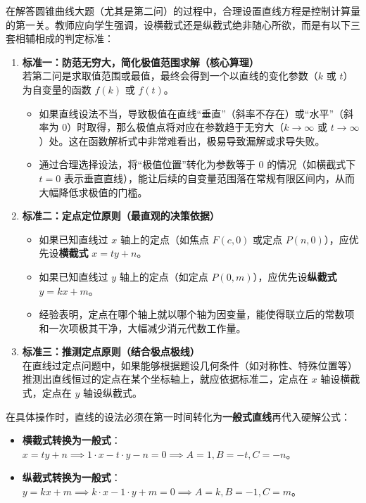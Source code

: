 \documentclass[11pt,a4paper]{ctexart}
\begin{document}
在解答圆锥曲线大题（尤其是第二问）的过程中，合理设置直线方程是控制计算量的第一关。教师应向学生强调，设横截式还是纵截式绝非随心所欲，而是有以下三套相辅相成的判定标准：

\begin{enumerate}[label=\arabic*.]
  \item \textbf{标准一：防范无穷大，简化极值范围求解（核心算理）} \\
        若第二问是求取值范围或最值，最终会得到一个以直线的变化参数（$k$ 或 $t$）为自变量的函数 $f(k)$ 或 $f(t)$。
        \begin{itemize}
          \item 如果直线设法不当，导致极值在直线“垂直”（斜率不存在）或“水平”（斜率为 $0$）时取得，那么极值点将对应在参数趋于无穷大（$k \to \infty$ 或 $t \to \infty$）处。这在函数解析式中非常难看出，极易导致漏解或求导失败。
          \item 通过合理选择设法，将“极值位置”转化为参数等于 $0$ 的情况（如横截式下 $t=0$ 表示垂直直线），能让后续的自变量范围落在常规有限区间内，从而大幅降低求极值的门槛。
        \end{itemize}
        
  \item \textbf{标准二：定点定位原则（最直观的决策依据）} \\
        \begin{itemize}
          \item 如果已知直线过 $x$ 轴上的定点（如焦点 $F(c,0)$ 或定点 $P(n,0)$），应优先设\textbf{横截式} $x = ty + n$。
          \item 如果已知直线过 $y$ 轴上的定点（如定点 $P(0,m)$），应优先设\textbf{纵截式} $y = kx + m$。
          \item 经验表明，定点在哪个轴上就以哪个轴为因变量，能使得联立后的常数项和一次项极其干净，大幅减少消元代数工作量。
        \end{itemize}

  \item \textbf{标准三：推测定点原则（结合极点极线）} \\
        在直线过定点问题中，如果能够根据题设几何条件（如对称性、特殊位置等）推测出直线恒过的定点在某个坐标轴上，就应依据标准二，定点在 $x$ 轴设横截式，定点在 $y$ 轴设纵截式。
\end{enumerate}

在具体操作时，直线的设法必须在第一时间转化为\textbf{一般式直线}再代入硬解公式：
\begin{itemize}
  \item \textbf{横截式转换为一般式}：$x = ty + n \implies 1 \cdot x - t \cdot y - n = 0 \implies A = 1, B = -t, C = -n$。
  \item \textbf{纵截式转换为一般式}：$y = kx + m \implies k \cdot x - 1 \cdot y + m = 0 \implies A = k, B = -1, C = m$。
\end{itemize}
\end{document}

